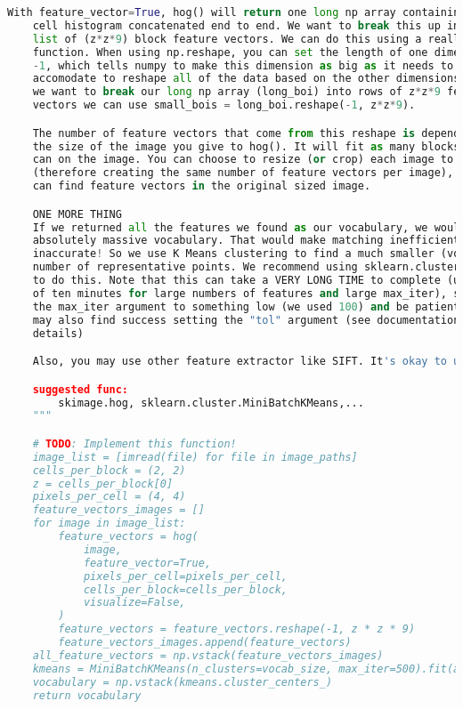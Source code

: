 \begin{lstlisting}[caption={student.py}, label={l:code-example}, captionpos=t, language=python]
    With feature_vector=True, hog() will return one long np array containing every
    cell histogram concatenated end to end. We want to break this up into a
    list of (z*z*9) block feature vectors. We can do this using a really nifty numpy
    function. When using np.reshape, you can set the length of one dimension to
    -1, which tells numpy to make this dimension as big as it needs to be to
    accomodate to reshape all of the data based on the other dimensions. So if
    we want to break our long np array (long_boi) into rows of z*z*9 feature
    vectors we can use small_bois = long_boi.reshape(-1, z*z*9).

    The number of feature vectors that come from this reshape is dependent on
    the size of the image you give to hog(). It will fit as many blocks as it
    can on the image. You can choose to resize (or crop) each image to a consistent size
    (therefore creating the same number of feature vectors per image), or you
    can find feature vectors in the original sized image.

    ONE MORE THING
    If we returned all the features we found as our vocabulary, we would have an
    absolutely massive vocabulary. That would make matching inefficient AND
    inaccurate! So we use K Means clustering to find a much smaller (vocab_size)
    number of representative points. We recommend using sklearn.cluster.KMeans
    to do this. Note that this can take a VERY LONG TIME to complete (upwards
    of ten minutes for large numbers of features and large max_iter), so set
    the max_iter argument to something low (we used 100) and be patient. You
    may also find success setting the "tol" argument (see documentation for
    details)

    Also, you may use other feature extractor like SIFT. It's okay to use skimage!

    suggested func:
        skimage.hog, sklearn.cluster.MiniBatchKMeans,...
    """

    # TODO: Implement this function!
    image_list = [imread(file) for file in image_paths]
    cells_per_block = (2, 2)
    z = cells_per_block[0]
    pixels_per_cell = (4, 4)
    feature_vectors_images = []
    for image in image_list:
        feature_vectors = hog(
            image,
            feature_vector=True,
            pixels_per_cell=pixels_per_cell,
            cells_per_block=cells_per_block,
            visualize=False,
        )
        feature_vectors = feature_vectors.reshape(-1, z * z * 9)
        feature_vectors_images.append(feature_vectors)
    all_feature_vectors = np.vstack(feature_vectors_images)
    kmeans = MiniBatchKMeans(n_clusters=vocab_size, max_iter=500).fit(all_feature_vectors)
    vocabulary = np.vstack(kmeans.cluster_centers_)
    return vocabulary



\end{lstlisting}
